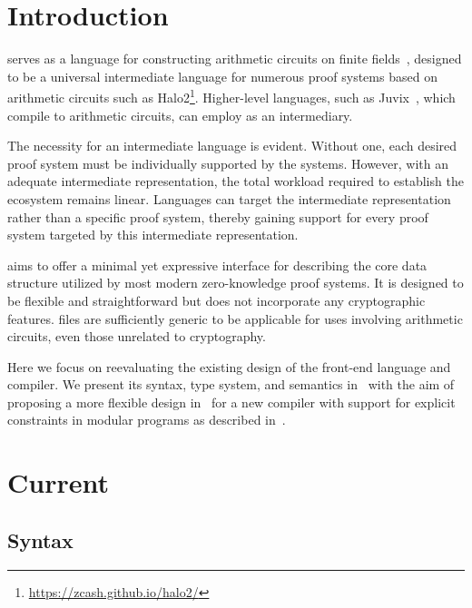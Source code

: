 \documentclass[
    9pt,            
    techreport,       
    affiltop,       
]{art}
\begin{document}
\maketitle
\tableofcontents

\section{Introduction}

\VampIR{} serves as a language for constructing arithmetic circuits on finite fields~\citep{anoma-vampir}, designed to be a universal intermediate language for numerous proof systems based on arithmetic circuits such as Halo2\footnote{\url{https://zcash.github.io/halo2/}}. Higher-level languages, such as Juvix~\citep{anoma-juvix}, which compile to arithmetic circuits, can employ \VampIR{} as an intermediary.

The necessity for an intermediate language is evident. Without one, each desired proof system must be individually supported by the systems. However, with an adequate intermediate representation, the total workload required to establish the ecosystem remains linear. Languages can target the intermediate representation rather than a specific proof system, thereby gaining support for every proof system targeted by this intermediate representation.

\VampIR{} aims to offer a minimal yet expressive interface for describing the core data structure utilized by most modern zero-knowledge proof systems. It is designed to be flexible and straightforward but does not incorporate any cryptographic features. \VampIR{} files are sufficiently generic to be applicable for uses involving arithmetic circuits, even those unrelated to cryptography.

Here we focus on reevaluating the existing design of the \VampIR{} front-end language and compiler. We present its syntax, type system, and semantics in~ with the aim of proposing a more flexible design in~ for a new compiler with support for explicit constraints in modular \VampIR{} programs as described in~. 

\section{Current \VampIR{}}\label{sec:current-vampIR}


\subsection{Syntax}\label{sec:syntax}
\end{document}
